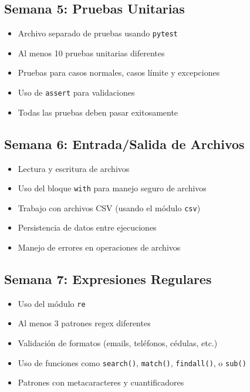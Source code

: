 \documentclass[12pt,a4paper]{article}
\begin{document}
\subsection{Semana 5: Pruebas Unitarias}
\begin{itemize}
    \item Archivo separado de pruebas usando \texttt{pytest}
    \item Al menos 10 pruebas unitarias diferentes
    \item Pruebas para casos normales, casos límite y excepciones
    \item Uso de \texttt{assert} para validaciones
    \item Todas las pruebas deben pasar exitosamente
\end{itemize}

\subsection{Semana 6: Entrada/Salida de Archivos}
\begin{itemize}
    \item Lectura y escritura de archivos
    \item Uso del bloque \texttt{with} para manejo seguro de archivos
    \item Trabajo con archivos CSV (usando el módulo \texttt{csv})
    \item Persistencia de datos entre ejecuciones
    \item Manejo de errores en operaciones de archivos
\end{itemize}

\subsection{Semana 7: Expresiones Regulares}
\begin{itemize}
    \item Uso del módulo \texttt{re}
    \item Al menos 3 patrones regex diferentes
    \item Validación de formatos (emails, teléfonos, cédulas, etc.)
    \item Uso de funciones como \texttt{search()}, \texttt{match()}, \texttt{findall()}, o \texttt{sub()}
    \item Patrones con metacaracteres y cuantificadores
\end{itemize}
\end{document}
